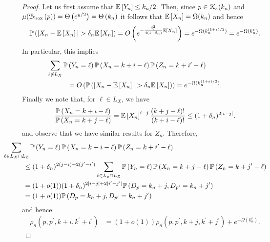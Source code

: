 \begin{proof}
Let us first assume that $\mathbb{E}\left[Y_n\right] \le k_n/2$. Then, since $p \in {\mathcal K}_{\varepsilon}(k_n)$ and $\mu({\mathcal B}_{\text{box}}\left(p\right)) = \Theta\left(e^{y/2}\right) = \Theta\left(k_n\right)$ it follows that $\mathbb{E}\left[X_n\right] = \Omega(k_n)$ and hence
\[
	\mathbb{P}\left(|X_n - \mathbb{E}\left[X_n\right]| > \delta_n \mathbb{E}\left[X_n\right]\right) = O\left(e^{-\frac{\delta_n^2}{4(1+\delta_n)} \mathbb{E}\left[X_n\right]}\right) = e^{-\Omega(k_n^{(1+\varepsilon)/2})} = e^{-\Omega(k_n^{\varepsilon})}.
\]
In particular, this implies
\begin{align*}
	&\hspace{-30pt}\sum_{\ell \notin L_X} \Prob{Y_n = \ell} \Prob{X_n = k + i - \ell} 
			\Prob{Z_n = k + i^\prime - \ell}\\
	&= \bigO{\Prob{|X_n - \Exp{X_n}| > \delta_n \Exp{X_n}}} = e^{-\Omega(k_n^{(1+\varepsilon)/2})}.
\end{align*}
Finally we note that, for $\ell \in L_X$, we have
\begin{equation}\label{eq:fraction_degree_prob}
	\frac{\mathbb{P}\left(X_n = k + i - \ell\right)}{\mathbb{P}\left(X_n = k + j - \ell\right)} = \mathbb{E}\left[X_n\right]^{i - j} \frac{(k + j - \ell)!}{(k + i - \ell)!}
	\le (1 + \delta_n)^{2|i - j|}.
\end{equation}
and observe that we have similar results for $Z_n$. Therefore,
\begin{align*}
	&\hspace{-30pt}\sum_{\ell \in L_X \cap L_Z} \Prob{Y_n = \ell} \Prob{X_n = k + i - \ell} 
		\Prob{Z_n = k + i^\prime - \ell} \\
	&\le (1+\delta_n)^{2(j-i) + 2(j^\prime - i^\prime)} \sum_{\ell \in L_x \cap L_Z} 
			\Prob{Y_n = \ell} \Prob{X_n = k + j - \ell} \Prob{Z_n = k + j^\prime - \ell}\\
	&= (1+o(1))(1+\delta_n)^{2|i-j| + 2|i^\prime - j^\prime|}\Prob{D_p = k_n + j, D_{p^\prime} = k_n + j^\prime}\\
	&= (1+o(1))\Prob{D_p = k_n + j, D_{p^\prime} = k_n + j^\prime}
\end{align*}
and hence
\begin{align*}
	\rho_n(p,p^\prime,k+i,k^\prime+i^\prime)
	&= (1+o(1))\rho_n(p,p^\prime,k+j,k^\prime+j^\prime) + e^{-\Omega(k_n^\varepsilon)}.
\end{align*}


\end{proof}
